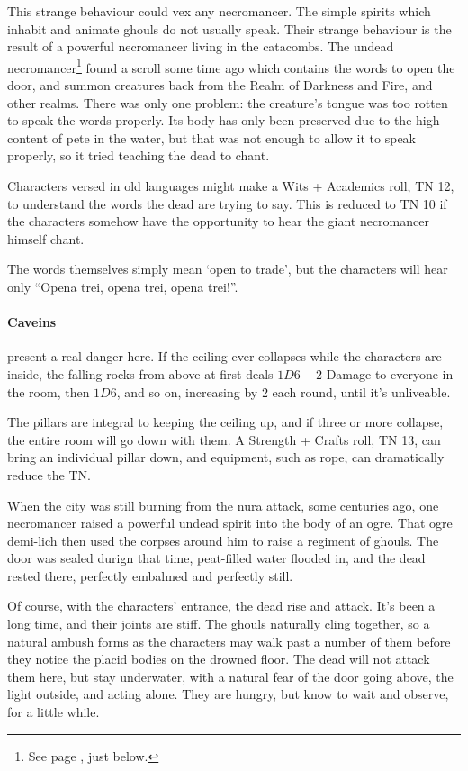 \begin{multicols}{2}
This strange behaviour could vex any necromancer.  The simple spirits which inhabit and animate ghouls do not usually speak.  Their strange behaviour is the result of a powerful necromancer living in the catacombs.  The undead necromancer\footnote{See page \pageref{undead_ogre}, just below.} found a scroll some time ago which contains the words to open the door, and summon creatures back from the Realm of Darkness and Fire, and other realms.  There was only one problem: the creature's tongue was too rotten to speak the words properly.  Its body has only been preserved due to the high content of pete in the water, but that was not enough to allow it to speak properly, so it tried teaching the dead to chant.


Characters versed in old languages might make a Wits + Academics roll, TN 12, to understand the words the dead are trying to say.  This is reduced to TN 10 if the characters somehow have the opportunity to hear the giant necromancer himself chant.

The words themselves simply mean `open to trade', but the characters will hear only ``Opena trei, opena trei, opena trei!''.

\paragraph{Caveins} present a real danger here.  If the ceiling ever collapses while the characters are inside, the falling rocks from above at first deals $1D6-2$ Damage to everyone in the room, then $1D6$, and so on, increasing by 2 each round, until it's unliveable.


The pillars are integral to keeping the ceiling up, and if three or more collapse, the entire room will go down with them.  A Strength + Crafts roll, TN 13, can bring an individual pillar down, and equipment, such as rope, can dramatically reduce the TN.

When the city was still burning from the nura attack, some centuries ago, one necromancer raised a powerful undead spirit into the body of an ogre.
That ogre demi-lich then used the corpses around him to raise a regiment of ghouls.
The door was sealed durign that time, peat-filled water flooded in, and the dead rested there, perfectly embalmed and perfectly still.

Of course, with the characters' entrance, the dead rise and attack.  It's been a long time, and their joints are stiff.  The ghouls naturally cling together, so a natural ambush forms as the characters may walk past a number of them before they notice the placid bodies on the drowned floor.  The dead will not attack them here, but stay underwater, with a natural fear of the door going above, the light outside, and acting alone.  They are hungry, but know to wait and observe, for a little while.


\end{multicols}
